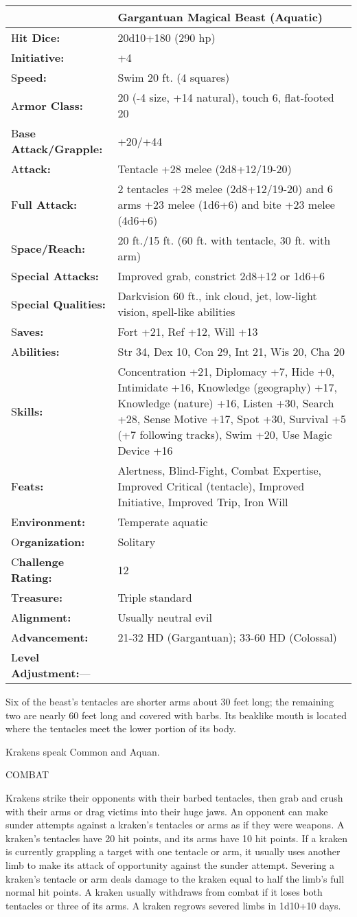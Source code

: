 \documentclass{article}
\begin{document}
\begin{tabular}{|>{\raggedright}p{82pt}|>{\raggedright}p{243pt}|}
\hline
  & Gargantuan Magical Beast (Aquatic)\tabularnewline
\hline
H\textbf{it Dice:} & 20d10+180 (290 hp)\tabularnewline
\hline
I\textbf{nitiative:} & +4\tabularnewline
\hline
S\textbf{peed:} & Swim 20 ft. (4 squares)\tabularnewline
\hline
A\textbf{rmor Class:} & 20 (-4 size, +14 natural), touch 6, flat-footed 20\tabularnewline
\hline
B\textbf{ase Attack/Grapple:} & +20/+44\tabularnewline
\hline
A\textbf{ttack:} & Tentacle +28 melee (2d8+12/19-20)\tabularnewline
\hline
F\textbf{ull Attack:} & 2 tentacles +28 melee (2d8+12/19-20) and 6 arms +23 melee 
(1d6+6) and bite +23 melee (4d6+6)\tabularnewline
\hline
S\textbf{pace/Reach:} & 20 ft./15 ft. (60 ft. with tentacle, 30 ft. with arm)\tabularnewline
\hline
S\textbf{pecial Attacks:} & Improved grab, constrict 2d8+12 or 1d6+6\tabularnewline
\hline
S\textbf{pecial Qualities:} & Darkvision 60 ft., ink cloud, jet, low-light vision, 
spell-like abilities\tabularnewline
\hline
S\textbf{aves:} & Fort +21, Ref +12, Will +13\tabularnewline
\hline
A\textbf{bilities:} & Str 34, Dex 10, Con 29, Int 21, Wis 20, Cha 20 \tabularnewline
\hline
S\textbf{kills:} & Concentration +21, Diplomacy +7, Hide +0, Intimidate +16, Knowledge 
(geography) +17, Knowledge (nature) +16, Listen +30, Search +28, Sense Motive +17, 
Spot +30, Survival +5 (+7 following tracks), Swim +20, Use Magic Device +16\tabularnewline
\hline
F\textbf{eats:} & Alertness, Blind-Fight, Combat Expertise, Improved Critical (tentacle), 
Improved Initiative, Improved Trip, Iron Will\tabularnewline
\hline
E\textbf{nvironment:} & Temperate aquatic\tabularnewline
\hline
O\textbf{rganization:} & Solitary\tabularnewline
\hline
C\textbf{hallenge Rating:} & 12\tabularnewline
\hline
T\textbf{reasure:} & Triple standard\tabularnewline
\hline
A\textbf{lignment:} & Usually neutral evil\tabularnewline
\hline
A\textbf{dvancement:} & 21-32 HD (Gargantuan); 33-60 HD (Colossal)\tabularnewline
\hline
L\textbf{evel Adjustment:}--- & \tabularnewline
\hline
\end{tabular}

Six of the beast's tentacles are shorter arms about 30 feet long; the remaining 
two are nearly 60 feet long and covered with barbs. Its beaklike mouth is located 
where the tentacles meet the lower portion of its body.

Krakens speak Common and Aquan.

COMBAT

Krakens strike their opponents with their barbed tentacles, then grab and crush 
with their arms or drag victims into their huge jaws. An opponent can make sunder 
attempts against a kraken's tentacles or arms as if they were weapons\textit{. 
}A kraken's tentacles have 20 hit points, and its arms have 10 hit points. If a 
kraken is currently grappling a target with one tentacle or arm, it usually uses 
another limb to make its attack of opportunity against the sunder attempt. Severing 
a kraken's tentacle or arm deals damage to the kraken equal to half the limb's 
full normal hit points. A kraken usually withdraws from combat if it loses both 
tentacles or three of its arms. A kraken regrows severed limbs in 1d10+10 days.
\end{document}
